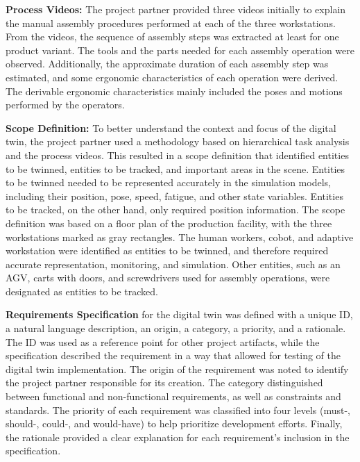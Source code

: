 \documentclass{llncs}
\begin{document}
    \textbf{Process Videos:}
    The project partner provided three videos initially to explain the manual assembly procedures performed at each of the three workstations. From the videos,  
    the sequence of assembly steps was extracted at least for one product variant. The tools and the parts needed for each assembly operation were observed. Additionally, the approximate duration of each assembly step 
    was estimated, and some ergonomic characteristics of each operation were derived. 
    The derivable ergonomic characteristics mainly included the poses and motions performed by the operators.

    \textbf{Scope Definition:}
    To better understand the context and focus of the digital twin, 
    the project partner used a methodology based on hierarchical task analysis and the process videos. 
    This resulted in a scope definition that identified entities to be twinned, entities to be tracked, and important areas in the scene. 
    Entities to be twinned needed to be represented accurately in the simulation models, including their position, pose, speed, fatigue, and other state variables. 
    Entities to be tracked, on the other hand, only required position information. The scope definition was based on a floor plan of the production facility, with the three workstations marked as gray rectangles. 
    The human workers, cobot, and adaptive workstation were identified as entities to be twinned, and therefore required accurate representation, 
    monitoring, and simulation. Other entities, such as an AGV, carts with doors, and screwdrivers used for assembly operations, were designated as entities to be tracked.

    \textbf{Requirements Specification} for the digital twin was defined with a unique ID, a natural language description, an origin, a category, a priority, and a rationale. The ID was used as a reference point for other project artifacts, while the specification described the requirement in a way that allowed for testing of the digital twin implementation. The origin of the requirement was noted to identify the project partner responsible for its creation. The category distinguished between functional and non-functional requirements, as well as constraints and standards. The priority of each requirement was classified into four levels 
    (must-, should-, could-, and would-have) to help prioritize development efforts. 
    Finally, the rationale provided a clear explanation for each requirement's inclusion in the specification.
\end{document}

